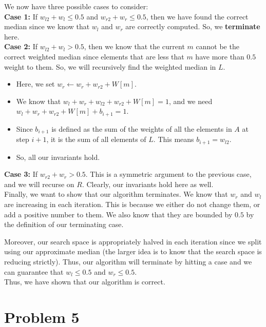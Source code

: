 \documentclass[a4paper]{article}
\begin{document}
\noindent We now have three possible cases to consider:\\

\noindent \textbf{Case 1:} If $w_{l2} + w_l \leq 0.5$ and $w_{r2} + w_r \leq 0.5$, then we have found the correct median since we know that $w_l$ and $w_r$ are correctly computed. So, we \textbf{terminate} here.\\

\noindent \textbf{Case 2:} If $w_{l2} + w_l > 0.5$, then we know that the current $m$ cannot be the correct weighted median since elements that are less that $m$ have more than $0.5$ weight to them. So, we will recursively find the weighted median in $L$.

\begin{itemize}
    \item Here, we set $w_r \leftarrow w_r + w_{r2} + W[m]$.
    \item We know that $w_l + w_r + w_{l2} + w_{r2} + W[m] = 1$, and we need $w_l + w_r + w_{r2} + W[m] + b_{i+1} = 1$.
    \item Since $b_{i+1}$ is defined as the sum of the weights of all the elements in $A$ at step $i + 1$, it is the sum of all elements of $L$. This means $b_{i+1} = w_{l2}$. 
    \item So, all our invariants hold. \\
\end{itemize}

\noindent \textbf{Case 3:} If $w_{r2} + w_r > 0.5$. This is a symmetric argument to the previous case, and we will recurse on $R$. Clearly, our invariants hold here as well.\\


\noindent Finally, we want to show that our algorithm terminates. We know that $w_r$ and $w_l$ are increasing in each iteration. This is because we either do not change them, or add a positive number to them. We also know that they are bounded by $0.5$ by the definition of our terminating case.

Moreover, our search space is appropriately halved in each iteration since we split using our approximate median (the larger idea is to know that the search space is reducing strictly). Thus, our algorithm will terminate by hitting a case and we can guarantee that $w_l \leq 0.5$ and $w_r \leq 0.5$.\\

\noindent Thus, we have shown that our algorithm is correct.


\newpage
\section*{Problem 5}
\end{document}
